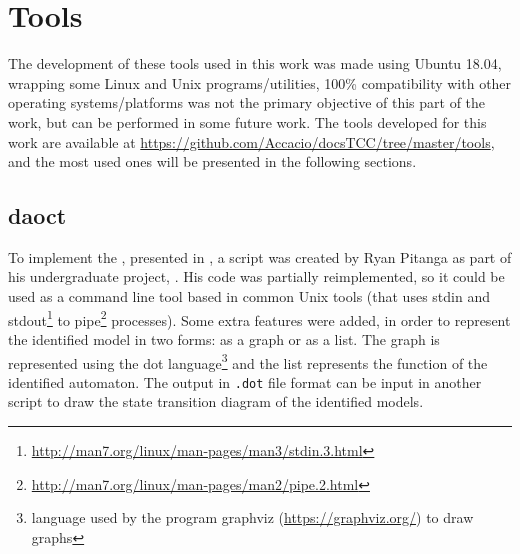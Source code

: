 
\chapter{Tools}
\label{cha:Tools}
 The development of
these tools used in this work was made using Ubuntu 18.04, wrapping some Linux and Unix
programs/utilities, 100\% compatibility with other operating systems/platforms
was not the primary objective of this part of the work, but can be performed in
some future work. 
The tools developed for this work are available at
\url{https://github.com/Accacio/docsTCC/tree/master/tools}, and the most used
ones will be presented in the following sections.
\section{daoct}
\label{sec:daoct}
To implement the , presented in
\cite{moreira2018enhanced}, a script was created by Ryan Pitanga as part of his
undergraduate project, \cite{pitanga2019modelo}. His code was partially
reimplemented, so it could be used as a command line tool based in common Unix
tools (that uses stdin and
stdout\footnote{\url{http://man7.org/linux/man-pages/man3/stdin.3.html}} to pipe\footnote{\url{http://man7.org/linux/man-pages/man2/pipe.2.html}}
processes).
Some extra features were added, in order to represent the identified model in two
forms: as a graph or as a list.
The graph is represented using the
dot language\footnote{language used by the program graphviz (\url{https://graphviz.org/})
  to draw graphs} and the list represents the \ffunction{} function of the identified automaton. The output in
\verb|.dot| file format can be
input in
another script to draw the state transition diagram of the identified models.

